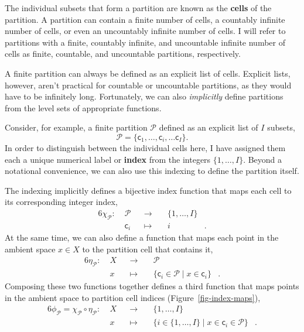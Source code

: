 \documentclass[
  letterpaper,
  DIV=11,
  numbers=noendperiod]{scrartcl}
\begin{document}
The individual subsets that form a partition are known as the
\textbf{cells} of the partition. A partition can contain a finite number
of cells, a countably infinite number of cells, or even an uncountably
infinite number of cells. I will refer to partitions with a finite,
countably infinite, and uncountable infinite number of cells as finite,
countable, and uncountable partitions, respectively.

A finite partition can always be defined as an explicit list of cells.
Explicit lists, however, aren't practical for countable or uncountable
partitions, as they would have to be infinitely long. Fortunately, we
can also \emph{implicitly} define partitions from the level sets of
appropriate functions.

Consider, for example, a finite partition \(\mathcal{P}\) defined as an
explicit list of \(I\) subsets, \[
\mathcal{P}
=
\{
  \mathsf{c}_{1}, \ldots, \mathsf{c}_{i}, \ldots \mathsf{c}_{I}
\}.
\] In order to distinguish between the individual cells here, I have
assigned them each a unique numerical label or \textbf{index} from the
integers \(\{1, \ldots, I \}\). Beyond a notational convenience, we can
also use this indexing to define the partition itself.

The indexing implicitly defines a bijective index function that maps
each cell to its corresponding integer index, \begin{alignat*}{6}
\chi_{\mathcal{P}}
:\; &\mathcal{P}& &\rightarrow& \; &\{1, \ldots, I \}&
\\
&\mathsf{c}_{i}& &\mapsto& &i&.
\end{alignat*} At the same time, we can also define a function that maps
each point in the ambient space \(x \in X\) to the partition cell that
contains it, \begin{alignat*}{6}
\eta_{\mathcal{P}}
:\; &X& &\rightarrow& \; &\mathcal{P}&
\\
&x& &\mapsto&
&\{ \mathsf{c}_{i} \in \mathcal{P} \mid x \in \mathsf{c}_{i} \}&.
\end{alignat*} Composing these two functions together defines a third
function that maps points in the ambient space to partition cell indices
(Figure~\ref{fig-index-maps}), \begin{alignat*}{6}
\phi_{\mathcal{P}} = \chi_{\mathcal{P}} \circ \eta_{\mathcal{P}}
:\; &X& &\rightarrow& \; &\{1, \ldots, I \}&
\\
&x& &\mapsto&
&\{ i \in \{1, \ldots, I \} \mid
    x \in \mathsf{c}_{i} \in \mathcal{P} \}&.
\end{alignat*}
\end{document}
